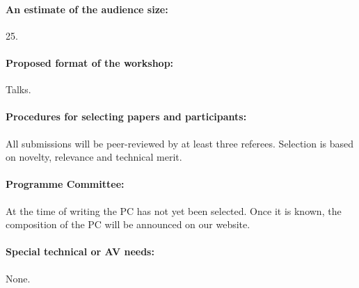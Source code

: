 \documentclass{article}
\begin{document}
    \paragraph{An estimate of the audience size:}
25.
    \paragraph{Proposed format of the workshop:}
Talks.
    \paragraph{Procedures for selecting papers and participants:}
    All submissions will be peer-reviewed by at least three referees.
    Selection is based on novelty, relevance and technical merit.
    \paragraph{Programme Committee:} At the time of writing the PC has not yet been selected. Once it is known, the composition of the PC will be announced on our website.
    \paragraph{Special technical or AV needs:}
None.
\end{document}
